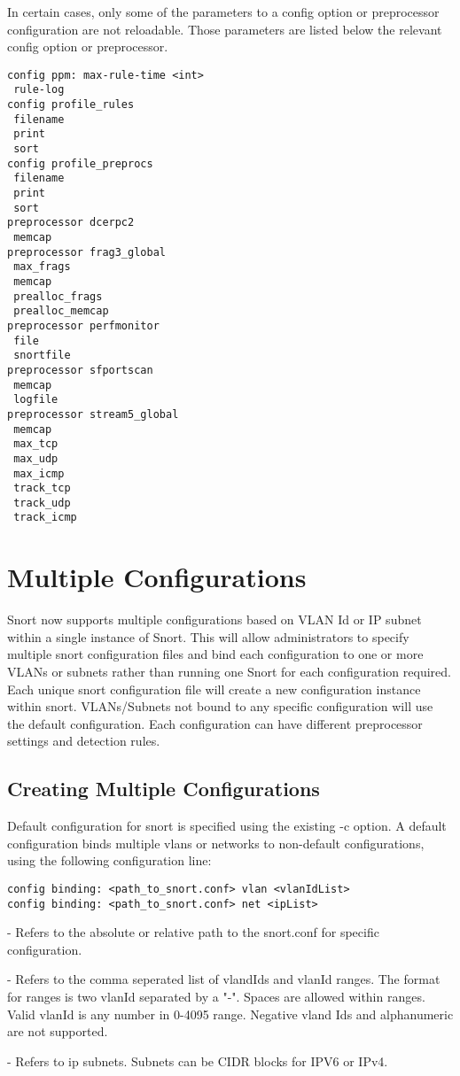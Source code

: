 \documentclass[english]{report}
\begin{document}
In certain cases, only some of the parameters to a config option or
preprocessor configuration are not reloadable.  Those parameters are
listed below the relevant config option or preprocessor.

\begin{verbatim}
config ppm: max-rule-time <int>
 rule-log
config profile_rules
 filename
 print
 sort
config profile_preprocs
 filename
 print
 sort
preprocessor dcerpc2
 memcap
preprocessor frag3_global
 max_frags
 memcap
 prealloc_frags
 prealloc_memcap
preprocessor perfmonitor
 file
 snortfile
preprocessor sfportscan
 memcap
 logfile
preprocessor stream5_global
 memcap
 max_tcp
 max_udp
 max_icmp
 track_tcp
 track_udp
 track_icmp
\end{verbatim}

\section{Multiple Configurations}

Snort now supports multiple configurations based on VLAN Id or IP subnet within 
a single instance of Snort. This will allow administrators to specify multiple 
snort configuration files and bind each configuration to one or more VLANs or 
subnets rather than running one Snort for each configuration required. Each 
unique snort configuration file will create a new configuration instance within 
snort. VLANs/Subnets not bound to any specific configuration will use the default 
configuration. Each configuration can have different preprocessor settings and 
detection rules.

\subsection{Creating Multiple Configurations}
Default configuration for snort is specified using the existing -c option. A 
default configuration binds multiple vlans or networks to non-default configurations, 
using the following configuration line:

\begin{verbatim}
config binding: <path_to_snort.conf> vlan <vlanIdList>
config binding: <path_to_snort.conf> net <ipList>
\end{verbatim}

\begin{description}{}

\item [\texttt{path\_to\_snort.conf}] - Refers to the absolute or relative path to 
the snort.conf for specific configuration.

\item [\texttt{vlanIdList}] - Refers to the comma seperated list of vlandIds and 
vlanId ranges. The format for ranges is two vlanId separated by a "-". Spaces are 
allowed within ranges. Valid vlanId is any number in 0-4095 range. Negative vland 
Ids and alphanumeric are not supported.

\item [\texttt{ipList}] - Refers to ip subnets. Subnets can be CIDR blocks for 
IPV6 or IPv4.

\end{description}
\end{document}
